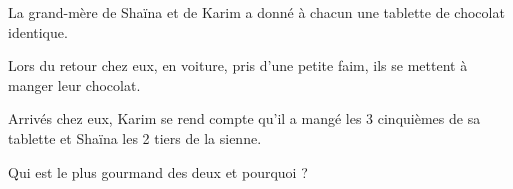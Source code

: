 \documentclass[a4paper]{book}
\begin{document}
\bigskip


    \begin{exercice}
        La grand-mère de Shaïna et de Karim a donné à chacun une tablette de chocolat identique.
           
        Lors du retour chez eux, en voiture, pris d'une petite faim, ils se mettent à manger leur chocolat.
    
        Arrivés chez eux, Karim se rend compte qu'il a mangé les 3 cinquièmes de sa tablette et Shaïna les 2 tiers de la sienne.
        
        Qui est le plus gourmand des deux et pourquoi ?
    \end{exercice}

    \begin{center}
    \end{center}
\end{document}

